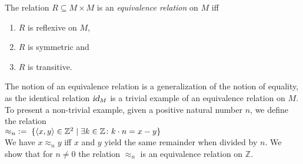 \begin{Definition}
The relation $R \subseteq M \times M$  is an
\emph{equivalence relation} on $M$ iff
\begin{enumerate}
\item $R$ is reflexive on $M$,
\item $R$ is symmetric and
\item $R$ is transitive.
\end{enumerate}
\end{Definition}

The notion of an equivalence relation is a generalization of the notion of equality, as
the identical relation $\textsl{id}_M$ is a trivial example of an equivalence relation on $M$.
To present a non-trivial example, given a positive natural number $n$, we define the relation 
 \\[0.2cm]
\hspace*{1.3cm}
 $\approx_n \;:=\; \{ \pair(x,y) \in \mathbb{Z}^2 \mid \exists k \in \mathbb{Z} \colon k \cdot n = x - y \}$
\\[0.2cm]
We have   $x \approx_n y$ iff $x$ and $y$ yield the same remainder when divided by $n$.
We show that for  $n \not=0$ the relation $\approx_n$ is an equivalence relation on $\mathbb{Z}$.
